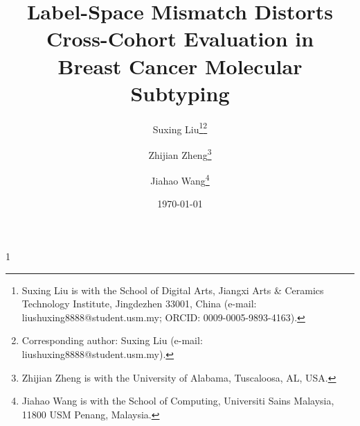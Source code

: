 \documentclass[11pt,a4paper]{article}
\begin{document}
\title{%
  \textbf{Label-Space Mismatch Distorts Cross-Cohort Evaluation in \\
  Breast Cancer Molecular Subtyping}%
}

\author{Suxing Liu\thanks{Suxing Liu is with the School of Digital Arts, Jiangxi Arts \& Ceramics Technology Institute, Jingdezhen 33001, China (e-mail: liushuxing8888@student.usm.my; ORCID: 0009-0005-9893-4163).}\thanks{Corresponding author: Suxing Liu (e-mail: liushuxing8888@student.usm.my).}\and Zhijian Zheng\thanks{Zhijian Zheng is with the University of Alabama, Tuscaloosa, AL, USA.}\and Jiahao Wang\thanks{Jiahao Wang is with the School of Computing, Universiti Sains Malaysia, 11800 USM Penang, Malaysia.}}

\date{\today}

\begin{spacing}{1}
\maketitle
\end{spacing}
\end{document}
